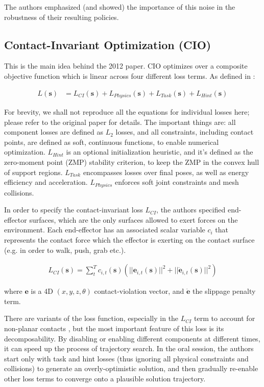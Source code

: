\documentclass{article}
\newcommand{\bvec}[1]{\boldsymbol{#1}}
\newcommand{\dbvec}[1]{\dot{\boldsymbol{#1}}}
\begin{document}
The authors emphasized (and showed) the importance of this noise in the robustness of their resulting policies.

\subsection{Contact-Invariant Optimization (CIO)}
This is the main idea behind the 2012 paper. CIO optimizes over a composite objective function which is linear across four different loss terms. As defined in \cite{mordatch2012contact}:

\begin{align*}
L(\bvec{s}) &= L_{CI}(\bvec{s}) + L_{Physics}(\bvec{s}) + L_{Task}(\bvec{s}) + L_{Hint}(\bvec{s})
\end{align*}

For brevity, we shall not reproduce all the equations for individual losses here; please refer to the original paper for details. The important things are: all component losses are defined as $L_2$ losses, and all constraints, including contact points, are defined as soft, continuous functions, to enable numerical optimization. $L_{Hint}$ is an optional initialization heuristic, and it's defined as the zero-moment point (ZMP) stability criterion, to keep the ZMP in the convex hull of support regions. $L_{Task}$ encompasses losses over final poses, as well as energy efficiency and acceleration. $L_{Physics}$ enforces soft joint constraints and mesh collisions.

In order to specify the contact-invariant loss $L_{CI}$, the authors specified end-effector surfaces, which are the only surfaces allowed to exert forces on the environment. Each end-effector has an associated scalar variable $c_i$ that represents the contact force which the effector is exerting on the contact surface (e.g. in order to walk, push, grab etc.).

\begin{align*}
	L_{CI}(\bvec{s}) = \sum_{t}^{T}c_{i,t}(\bvec{s}) (||\bvec{e}_{i,t}(\bvec{s})||^2 + ||\dbvec{e}_{i,t}(\bvec{s})||^2 )
\end{align*}

where $\bvec{e}$ is a 4D $(x,y,z,\theta)$ contact-violation vector, and $\dbvec{e}$ the slippage penalty term.

There are variants of the loss function, especially in the $L_{CI}$ term to account for non-planar contacts \cite{mordatch2012contact}, but the most important feature of this loss is its decomposability. By disabling or enabling different components at different times, it can speed up the process of trajectory search. In the oral session, the authors start only with task and hint losses (thus ignoring all physical constraints and collisions) to generate an overly-optimistic solution, and then gradually re-enable other loss terms to converge onto a plausible solution trajectory.
\end{document}
